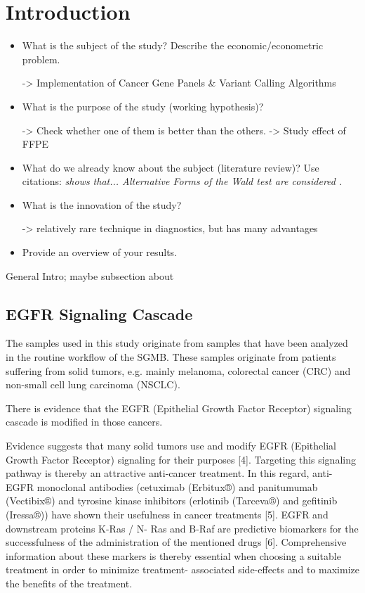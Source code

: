 \section{Introduction}

\begin{itemize}

\item What is the subject of the study? Describe the
economic/econometric problem.

-> Implementation of Cancer Gene Panels & Variant Calling Algorithms

\item What is the purpose of the study (working hypothesis)?

-> Check whether one of them is better than the others.
-> Study effect of FFPE

\item What do we already know about the subject (literature
review)? Use citations: {\it \citet{mutect:2013} shows that...
Alternative Forms of the Wald test are considered
\citep{Breusch&Schmidt:88}.}

\item What is the innovation of the study?

-> relatively rare technique in diagnostics, but has many advantages

\item Provide an overview of your results.


\end{itemize}

General Intro; maybe subsection about

\subsection{EGFR Signaling Cascade}

The samples used in this study originate from samples that have been analyzed in
the routine workflow of the SGMB. These samples originate from patients suffering
from solid tumors, e.g. mainly melanoma, colorectal cancer (CRC) and non-small cell
lung carcinoma (NSCLC).

There is evidence that the EGFR (Epithelial Growth Factor Receptor) signaling
cascade is modified in those cancers.

Evidence suggests that many solid tumors use and modify EGFR (Epithelial
Growth Factor Receptor) signaling for their purposes [4]. Targeting this
signaling pathway is thereby an attractive anti-cancer treatment. In this
regard, anti-EGFR monoclonal antibodies (cetuximab (Erbitux®) and panitumumab
(Vectibix®) and tyrosine kinase inhibitors (erlotinib (Tarceva®) and gefitinib
(Iressa®)) have shown their usefulness in cancer treatments [5]. EGFR and
downstream proteins K-Ras / N- Ras and B-Raf are predictive biomarkers for the
successfulness of the administration of the mentioned drugs [6]. Comprehensive
information about these markers is thereby essential when choosing a suitable
treatment in order to minimize treatment- associated side-effects and to
maximize the benefits of the treatment.

